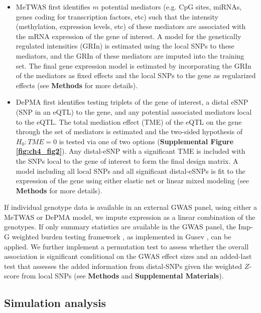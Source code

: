 \begin{itemize}

\item MeTWAS first
identifies $m$ potential mediators
(e.g. CpG sites,
miRNAs, genes coding
for transcription
factors, etc) such
that the intensity (methylation, 
expression levels, etc) 
of these mediators are associated
with the mRNA expression of the gene of interest.
A model for the
genetically regulated intensities
(GRIn)
is estimated using
the local SNPs
to these mediators, and
the GRIn of these mediators
are imputed into the training
set.
The final gene expression model
is estimated by incorporating
the GRIn of the mediators
as fixed effects and 
the local SNPs 
to the gene as regularized
effects (see \textbf{Methods}
for more details).

\item DePMA
first identifies
testing triplets
of the gene of
interest, a distal
eSNP (SNP
in an eQTL) to the gene,
and any potential associated mediators local
to the eQTL. 
The total mediation effect (TME) 
of the eQTL on the gene 
through the set of mediators
is estimated
and the two-sided
hypothesis of $H_0: TME = 0$ is tested
via one of two options (\textbf{Supplemental
Figure \ref{fig:ch4_fig2}}).
Any distal-eSNP with a significant
TME is included with the SNPs
local to the gene of interest
to form the final design matrix.
A model including all
local SNPs and all significant
distal-eSNPs is fit to
the expression of the gene
using either elastic net
or linear mixed modeling (see \textbf{Methods}
for more details).

\end{itemize}

If individual genotype
data is available in
an external GWAS panel, using either
a MeTWAS or DePMA model, we impute expression
as a linear combination of the genotypes. If
only summary statistics are available
in the GWAS panel, the Imp-G weighted burden
testing framework \cite{Pasaniuc2014FastEnrichment},
as implemented in Gusev \etal \cite{Gusev2016},
can be applied. We further implement
a permutation test to assess whether
the overall association is significant
conditional on the GWAS effect sizes \cite{Gusev2016}
and an added-last test that assesses
the added information from distal-SNPs
given the weighted $Z$-score
from local SNPs (see \textbf{Methods} and \textbf{Supplemental
Materials}).

\subsection{Simulation analysis}

